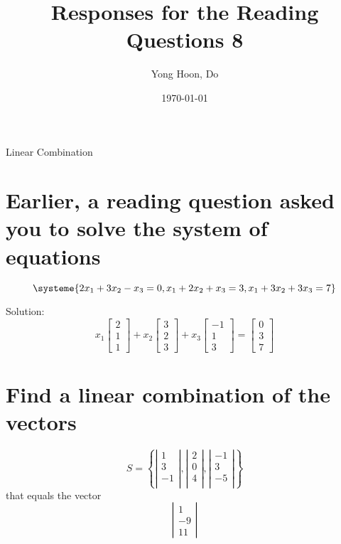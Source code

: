 \documentclass{article}
\title{Responses for the Reading Questions 8}
\author{Yong Hoon, Do}
\date{\today}
\begin{document}
\maketitle

\begin{center}
Linear Combination
\end{center}

\section{Earlier, a reading question asked you to solve the system of equations}
\[
\systeme {
2x_1 + 3x_2 - x_3 = 0,
x_1 + 2x_2 + x_3 = 3,
x_1 + 3x_2 + 3x_3 = 7
}
\]

Solution:
\[
x_1 \begin{bmatrix} 2 \\ 1 \\ 1 \end{bmatrix} +
x_2 \begin{bmatrix} 3 \\ 2 \\ 3 \end{bmatrix} +
x_3 \begin{bmatrix} -1 \\ 1 \\ 3 \end{bmatrix} =
\begin{bmatrix} 0 \\ 3 \\ 7 \end{bmatrix}
\]

\section{Find a linear combination of the vectors}
\[S=
\left\{
\left| \begin{array}{c}
1 \\
3 \\
-1 \\
\end{array} \right|
,
\left| \begin{array}{c}
2 \\
0 \\
4 \\
\end{array} \right|
,
\left| \begin{array}{c}
-1 \\
3 \\
-5 \\
\end{array} \right|
\right\}
\]
that equals the vector
\[
\left| \begin{array}{c} 1 \\ -9 \\ 11 \end{array} \right|
\]
\end{document}
